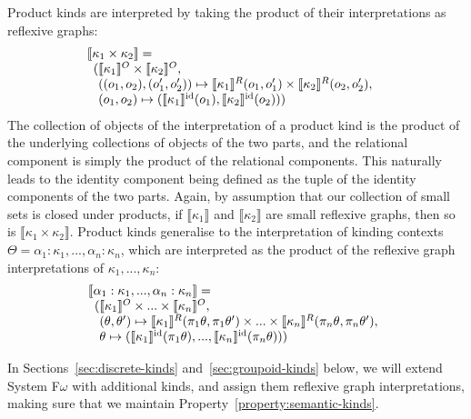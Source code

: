 \documentclass{sigplanconf}
\theoremstyle{examplestyle}
\newcommand{\sem}[1]{\llbracket #1 \rrbracket}
\newcommand{\semKU}[1]{\llbracket #1 \rrbracket^O}
\newcommand{\semKR}[1]{\llbracket #1 \rrbracket^R}
\newcommand{\semKI}[1]{\llbracket #1 \rrbracket^{\mathrm{id}}}
\begin{document}
Product kinds are interpreted by taking the product of their
interpretations as reflexive graphs:
\begin{displaymath}
  \begin{array}{@{}l}
    \sem{\kappa_1 \times \kappa_2} = \\
    \begin{array}[t]{l@{}l}
      (& \semKU{\kappa_1} \times \semKU{\kappa_2}, \\
      & ((o_1,o_2),(o_1',o_2')) \mapsto \semKR{\kappa_1}(o_1,o_1') \times \semKR{\kappa_2}(o_2,o_2'), \\
      & (o_1,o_2) \mapsto (\semKI{\kappa_1}(o_1), \semKI{\kappa_2}(o_2)))
    \end{array}
  \end{array}
\end{displaymath}
The collection of objects of the interpretation of a product kind is
the product of the underlying collections of objects of the two parts,
and the relational component is simply the product of the relational
components. This naturally leads to the identity component being
defined as the tuple of the identity components of the two
parts. Again, by assumption that our collection of small sets is
closed under products, if $\sem{\kappa_1}$ and $\sem{\kappa_2}$ are
small reflexive graphs, then so is $\sem{\kappa_1 \times
  \kappa_2}$. Product kinds generalise to the interpretation of
kinding contexts $\Theta = \alpha_1 : \kappa_1, ..., \alpha_n :
\kappa_n$, which are interpreted as the product of the reflexive graph
interpretations of $\kappa_1, ..., \kappa_n$:
\begin{displaymath}
  \begin{array}{l}
    \sem{\alpha_1 : \kappa_1, ..., \alpha_n : \kappa_n} = \\
    \begin{array}[t]{l@{}l}
      (&\semKU{\kappa_1} \times ... \times \semKU{\kappa_n}, \\
      &(\theta,\theta') \mapsto \semKR{\kappa_1}(\pi_1\theta, \pi_1\theta') \times ... \times \semKR{\kappa_n}(\pi_n\theta, \pi_n\theta'), \\
      &\theta \mapsto (\semKI{\kappa_1}(\pi_1 \theta), ..., \semKI{\kappa_n}(\pi_n \theta)))
    \end{array}
  \end{array}
\end{displaymath}

In Sections~\ref{sec:discrete-kinds} and~\ref{sec:groupoid-kinds}
below, we will extend System F$\omega$ with additional kinds, and
assign them reflexive graph interpretations, making sure that we
maintain Property~\ref{property:semantic-kinds}.
\end{document}
